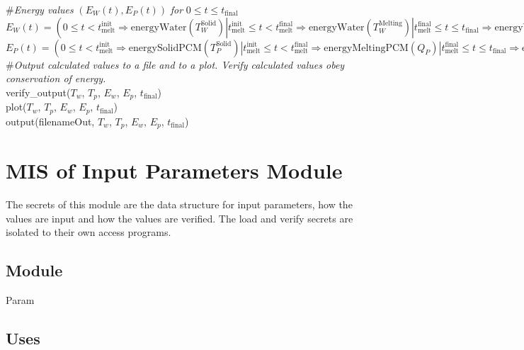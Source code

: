 \documentclass[12pt, titlepage]{article}
\begin{document}
\noindent \#\textit{Energy values} $(E_W(t), E_P(t))$ \textit{for} $0 \leq t \leq t_\text{final}$\\

\noindent $E_W(t) = (0 \leq t < t_\text{melt}^{\text{init}} \Rightarrow
\text{energyWater}(T_W^{\text{Solid}}) | t_\text{melt}^{\text{init}} \leq t <
t_\text{melt}^{\text{final}} \Rightarrow \text{energyWater}(T_W^{\text{Melting}}) | t_\text{melt}^{\text{final}} \leq t \leq
t_\text{final} \Rightarrow \text{energyWater}(T_W^{\text{Liquid}}) )$\\

\noindent $E_P(t) = (0 \leq t < t_\text{melt}^{\text{init}} \Rightarrow
\text{energySolidPCM}(T_P^{\text{Solid}}) | t_\text{melt}^{\text{init}} \leq t <
t_\text{melt}^{\text{final}} \Rightarrow \text{energyMeltingPCM}(Q_P) | t_\text{melt}^{\text{final}} \leq t \leq
t_\text{final} \Rightarrow \text{energyLiquidPCM}(T_P^{\text{Liquid}}) )$\\

\noindent \#\textit{Output calculated values to a file and to a plot.  Verify
  calculated values obey conservation of energy.}\\

\noindent verify\_output($T_w$, $T_p$, $E_w$, $E_p$, $t_\text{final}$)\\

\noindent plot($T_w$, $T_p$, $E_w$, $E_p$, $t_\text{final}$)\\

\noindent output(filenameOut, $T_w$, $T_p$, $E_w$, $E_p$, $t_\text{final}$)\\

\newpage

\section{MIS of Input Parameters Module} \label{Parameters}

The secrets of this module are the data structure for input parameters, how the
values are input and how the values are verified.  The load and verify secrets
are isolated to their own access programs.

\subsection{Module}

Param

\subsection{Uses}
\end{document}
